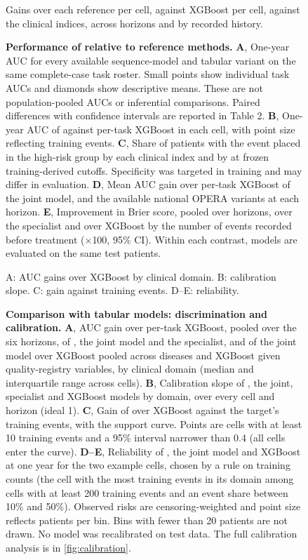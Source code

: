 \begin{figure}[H]
    {Gains over each reference per cell, against XGBoost per cell, against the
    clinical indices, across horizons and by recorded history.}
  \caption{\textbf{Performance of \opera{} relative to reference
  methods.} \textbf{A}, One-year AUC for every available sequence-model and
  tabular variant on the same complete-case task roster. Small points show
  individual task AUCs and diamonds show descriptive means. These are not
  population-pooled AUCs or inferential comparisons. Paired differences with
  confidence intervals are reported in Table 2. \textbf{B}, One-year AUC of \opera{}
  against per-task XGBoost in each cell, with point size reflecting training events.
  \textbf{C}, Share of patients with the event placed in the high-risk group by
  each clinical index and by \opera{} at frozen training-derived cutoffs.
  Specificity was targeted in training and may differ in evaluation. \textbf{D}, Mean AUC gain over per-task XGBoost of
  the joint model, \opera{} and the available
  national OPERA variants at each horizon. \textbf{E}, Improvement in Brier
  score, pooled over horizons, over the specialist and over XGBoost by the number
  of events recorded before treatment ($\times$100, 95\% CI). Within each contrast, models are evaluated on the same test patients.}
  \label{fig:headline}
\end{figure}

\begin{figure}[H]
    {A: AUC gains over XGBoost by clinical domain. B: calibration slope.
    C: gain against training events. D--E: reliability.}
  \caption{\textbf{Comparison with tabular models: discrimination and
  calibration.} \textbf{A}, AUC gain over per-task XGBoost, pooled over the six
  horizons, of \opera{}, the joint model and the specialist, and of the joint
  model over XGBoost pooled across diseases and XGBoost given quality-registry
  variables, by clinical domain (median and interquartile range across cells).
  \textbf{B}, Calibration slope of \opera{}, the joint, specialist and XGBoost
  models by domain, over every cell and horizon (ideal 1). \textbf{C}, Gain of \opera{} over XGBoost
  against the target's training events, with the support curve. Points are
  cells with at least 10 training events and a 95\% interval narrower than 0.4
  (all cells enter the curve).  \textbf{D--E},
  Reliability of \opera{}, the joint model and XGBoost at one year for the
  two example cells, chosen by a rule on training counts (the cell with the most
  training events in its domain among cells with at least 200 training events
  and an event share between 10\% and 50\%). Observed risks are censoring-weighted and point size reflects patients per
  bin. Bins with fewer than 20 patients are not drawn. No model was recalibrated on test data. The full calibration analysis is in \cref{fig:calibration}.}
  \label{fig:tabular}
\end{figure}

